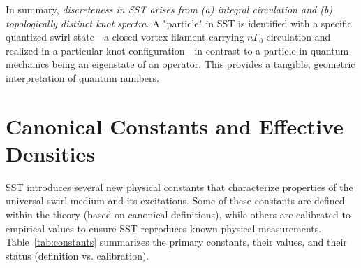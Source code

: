 \documentclass[10pt,reprint,aps,onecolumn,nofootinbib]{revtex4-2}
\begin{document}
	In summary, \emph{discreteness in SST arises from (a) integral circulation and (b) topologically distinct knot spectra}. A "particle" in SST is identified with a specific quantized swirl state—a closed vortex filament carrying $n\Gamma_0$ circulation and realized in a particular knot configuration—in contrast to a particle in quantum mechanics being an eigenstate of an operator. This provides a tangible, geometric interpretation of quantum numbers.



	\section{Canonical Constants and Effective Densities}
	SST introduces several new physical constants that characterize properties of the universal swirl medium and its excitations. Some of these constants are defined within the theory (based on canonical definitions), while others are calibrated to empirical values to ensure SST reproduces known physical measurements. Table~\ref{tab:constants} summarizes the primary constants, their values, and their status (definition vs. calibration).
\end{document}
